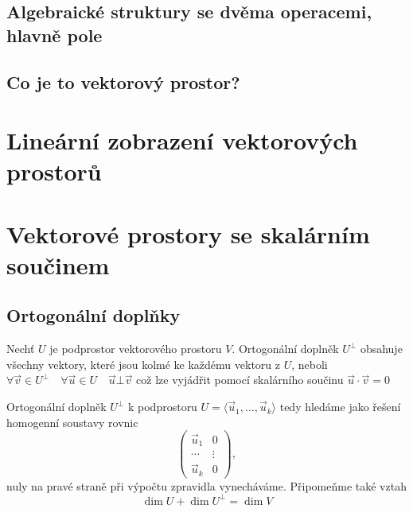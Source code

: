         
        
      \subsection{Algebraické struktury se dvěma operacemi, hlavně pole}
      
      \subsection{Co je to vektorový prostor?}
        
  \section{Lineární zobrazení vektorových prostorů}
  \section{Vektorové prostory se skalárním součinem}
    \subsection{Ortogonální doplňky}
      Nechť \(U\) je podprostor vektorového prostoru \(V\). Ortogonální doplněk $U^\bot$ obsahuje 
      všechny vektory, které jsou kolmé ke každému vektoru z \(U\), neboli \(\forall\vec{v}\in 
      U^\bot\quad \forall\vec{u}\in U\quad \vec{u}\bot\vec{v}\) což lze vyjádřit pomocí skalárního 
      součinu \(\vec{u}\cdot\vec{v} = 0\)

      Ortogonální doplněk \(U^\bot\) k podprostoru \(U = \langle\vec{u}_1,\ldots,\vec{u}_k\rangle\) 
      tedy hledáme jako řešení homogenní soustavy rovnic
      \begin{equation*}
        \left(
          \begin{array}{c|c}
            \vec{u}_1  &   0      \\
            \cdots     &  \vdots  \\
            \vec{u}_k  &   0
          \end{array}
        \right),
      \end{equation*}
      nuly na pravé straně při výpočtu zpravidla vynecháváme. Připomeňme také vztah
      \begin{equation}\label{LA:eq_dim_doplnek}
        \dim U + \dim U^\bot = \dim V
      \end{equation}

